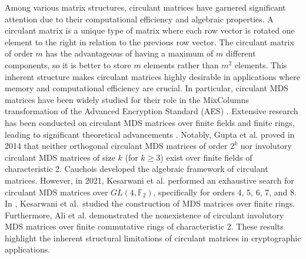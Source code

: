 \documentclass[12pt]{article}
\begin{document}
Among various matrix structures, circulant matrices have garnered significant attention due to their computational efficiency and algebraic properties. A circulant matrix is a unique type of matrix where each row vector is rotated one element to the right in relation to the previous row vector. The circulant matrix of order $m$ has the advantageous of having a maximum of $m$ different components, so it is better to store $m$ elements rather than $m^2$ elements. This inherent structure makes circulant matrices highly desirable in applications where memory and computational efficiency are crucial. In particular, circulant MDS matrices have been widely studied for their role in the MixColumns transformation of the Advanced Encryption Standard (AES) \cite{daemen2002design}. Extensive research has been conducted on circulant MDS matrices over finite fields and finite rings, leading to significant theoretical advancements \cite{adhiguna2022orthogonal, ali2024circulant, ali2024xor, cauchois2019circulant, gupta2015cryptographically, kesarwani2021recursive}. Notably, Gupta et al. \cite{gupta2015cryptographically} proved in 2014 that neither orthogonal circulant MDS matrices of order $2^k$ nor involutory circulant MDS matrices of size $k$ (for $k \geq 3$) exist over finite fields of characteristic 2. Cauchois \cite{cauchois2019circulant} developed the algebraic framework of circulant matrices. However, in 2021, Kesarwani et al. \cite{ kesarwani2019exhaustive} performed an  exhaustive search for circulant MDS matrices over $GL(4, \mathbb{F}_2)$, specifically for  orders 4, 5, 6, 7, and 8. In \cite{kesarwani2021recursive}, Kesarwani et al.\ studied the construction of MDS matrices over finite rings.
Furthermore, Ali et al. \cite{ali2024circulant} demonstrated the nonexistence of circulant involutory MDS matrices over finite commutative rings of characteristic 2. These results highlight the inherent structural limitations of circulant matrices in cryptographic applications.
\end{document}

